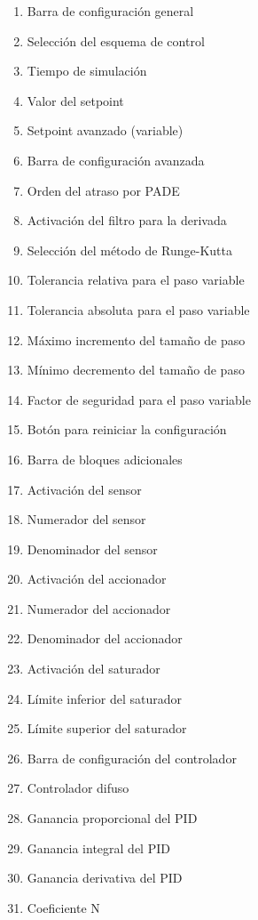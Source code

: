     \begin{multicols}{2}
        \begin{enumerate}[leftmargin=20pt]
            \item Barra de configuración general
            \item Selección del esquema de control
            \item Tiempo de simulación
            \item Valor del setpoint
            \item Setpoint avanzado (variable)
            \item Barra de configuración avanzada
            \item Orden del atraso por PADE
            \item Activación del filtro para la derivada
            \item Selección del método de Runge-Kutta
            \item Tolerancia relativa para el paso variable
            \item Tolerancia absoluta para el paso variable
            \item Máximo incremento del tamaño de paso
            \item Mínimo decremento del tamaño de paso
            \item Factor de seguridad para el paso variable
            \item Botón para reiniciar la configuración
            \item Barra de bloques adicionales
            \item Activación del sensor
            \item Numerador del sensor
            \item Denominador del sensor
            \item Activación del accionador
            \item Numerador del accionador
            \item Denominador del accionador
            \item Activación del saturador
            \item Límite inferior del saturador
            \item Límite superior del saturador
            \item Barra de configuración del controlador
            \item Controlador difuso
            \item Ganancia proporcional del PID
            \item Ganancia integral del PID
            \item Ganancia derivativa del PID
            \item Coeficiente N
        \end{enumerate}
    \end{multicols}

